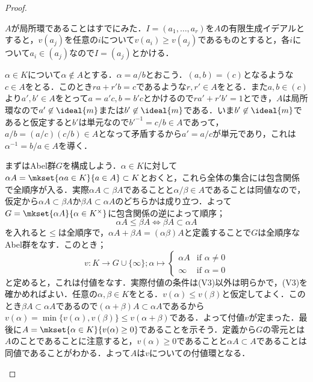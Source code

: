 \begin{proof}
	\begin{eqv}[3]
		\item $A$が局所環であることはすでにみた．$I=(a_1,\dots,a_r)$を$A$の有限生成イデアルとすると，$v(a_j)$を任意の$i$について$v(a_i)\geq v(a_j)$であるものとすると，各$i$について$a_i\in (a_j)$なので$I=(a_j)$とかける．
		
		\item
		$\alpha\in K$について$\alpha\not\in A$とする．$\alpha=a/b$とおこう．$(a,b)=(c)$となるような$c\in A$をとる．このとき$ra+r'b=c$であるような$r,r'\in A$をとる．また$a,b\in(c)$より$a',b'\in A$をとって$a=a'c, b=b'c$とかけるので$ra'+r'b'=1$とでき，$A$は局所環なので$a'\not\in\ideal{m}$または$b'\not\in\ideal{m}$である．いま$b'\not\in\ideal{m}$であると仮定すると$b'$は単元なので$b'^{-1}=c/b\in A$であって，$a/b=(a/c)(c/b)\in A$となって矛盾するから$a'=a/c$が単元であり，これは$\alpha^{-1}=b/a\in A$を導く．
		
		\item まずはAbel群$G$を構成しよう．$\alpha\in K$に対して$\alpha A=\mkset{\alpha a\in K}{a\in A}\subset K$とおくと，これら全体の集合には包含関係で全順序が入る．実際$\alpha A\subset\beta A$であることと$\alpha/\beta\in A$であることは同値なので，仮定から$\alpha A\subset\beta A$か$\beta A\subset\alpha A$のどちらかは成り立つ．よって$G=\mkset{\alpha A}{\alpha\in K^\times}$に包含関係の逆によって順序；
		\[\alpha A\leq\beta A\Longleftrightarrow \beta A\subset\alpha A\]
		を入れると$\leq $は全順序で，$\alpha A+\beta A=(\alpha\beta)A$と定義することで$G$は全順序なAbel群をなす．このとき；
		\[v:K\to G\cup\{\infty\};\alpha\mapsto\begin{cases}
			\alpha A&\text{if~$\alpha\neq 0$}\\
			\infty&\text{if~$\alpha=0$}
		\end{cases}\]
		と定めると，これは付値をなす．実際付値の条件は(V3)以外は明らかで，(V3)を確かめればよい．任意の$\alpha,\beta\in K$をとる．$v(\alpha)\leq v(\beta)$と仮定してよく．このとき$\beta A\subset\alpha A$であるので$(\alpha+\beta)A\subset\alpha A$であるから$v(\alpha)=\min\{v(\alpha),v(\beta)\}\leq v(\alpha+\beta)$である．よって付値$v$が定まった．最後に$A=\mkset{\alpha\in K}{v(\alpha)\geq 0}$であることを示そう．定義から$G$の零元とは$A$のことであることに注意すると，$v(\alpha)\geq 0$であることと$\alpha A\subset A$であることは同値であることがわかる．よって$A$は$v$についての付値環となる．
		\end{eqv}
\end{proof}

